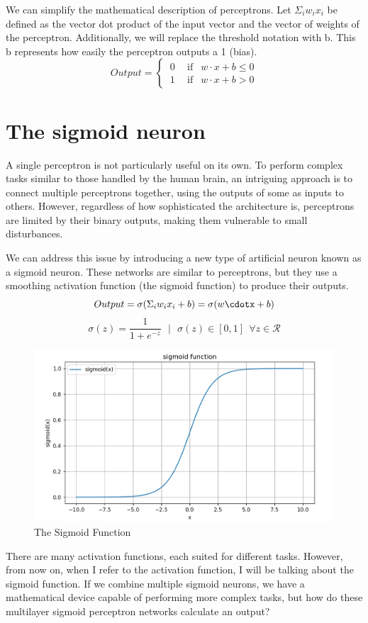 \documentclass[../main]{subfiles}
\begin{document}
We can simplify the mathematical description of perceptrons. Let $\Sigma_iw_i x_i$ be defined as the vector dot product of the input vector and the vector of weights of the perceptron. Additionally, we will replace the threshold notation with b. This b represents how easily the perceptron outputs a 1 (bias).
\begin{equation*}
    Output = \begin{cases}
  \ 0 \ \ & \text{if } \ \ w\cdot x + b \leq 0 \\
  \ 1 \ & \text{if } \ \ w\cdot x + b > 0
\end{cases}
\end{equation*}
\section{The sigmoid neuron}
A single perceptron is not particularly useful on its own. To perform complex tasks similar to those handled by the human brain, an intriguing approach is to connect multiple perceptrons together, using the outputs of some as inputs to others. However, regardless of how sophisticated the architecture is, perceptrons are limited by their binary outputs, making them vulnerable to small disturbances.

We can address this issue by introducing a new type of artificial neuron known as a sigmoid neuron. These networks are similar to perceptrons, but they use a smoothing activation function (the sigmoid function) to produce their outputs.
\begin{equation*}
    Output = \sigma (\Sigma_iw_ix_i+b)= \sigma(w\cdotx+b)
\end{equation*}
\begin{equation*}
    \sigma(z) = \frac{1}{1+e^{-z}} \ \ \ | \ \ \ \sigma(z) \in [0, 1] \ \ \forall z \in \mathcal{R}
\end{equation*}
\begin{figure}[H]
  \centering
  \includegraphics[width=1\textwidth]{./figures/sigmoid}
  \caption{The Sigmoid Function}
  \label{fig:red}
\end{figure}
There are many activation functions, each suited for different tasks. However, from now on, when I refer to the activation function, I will be talking about the sigmoid function. If we combine multiple sigmoid neurons, we have a mathematical device capable of performing more complex tasks, but how do these multilayer sigmoid perceptron networks calculate an output?
\end{document}
